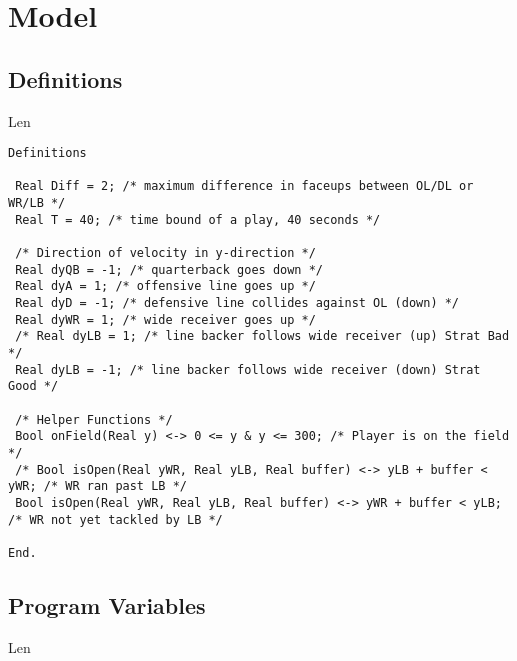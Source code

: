 \newpage


\section{Model}

\subsection{Definitions}

Len

\begin{lstlisting}
Definitions

 Real Diff = 2; /* maximum difference in faceups between OL/DL or WR/LB */
 Real T = 40; /* time bound of a play, 40 seconds */

 /* Direction of velocity in y-direction */
 Real dyQB = -1; /* quarterback goes down */
 Real dyA = 1; /* offensive line goes up */
 Real dyD = -1; /* defensive line collides against OL (down) */
 Real dyWR = 1; /* wide receiver goes up */
 /* Real dyLB = 1; /* line backer follows wide receiver (up) Strat Bad */
 Real dyLB = -1; /* line backer follows wide receiver (down) Strat Good */

 /* Helper Functions */
 Bool onField(Real y) <-> 0 <= y & y <= 300; /* Player is on the field */
 /* Bool isOpen(Real yWR, Real yLB, Real buffer) <-> yLB + buffer < yWR; /* WR ran past LB */
 Bool isOpen(Real yWR, Real yLB, Real buffer) <-> yWR + buffer < yLB; /* WR not yet tackled by LB */

End.
\end{lstlisting}

\subsection{Program Variables}

Len

